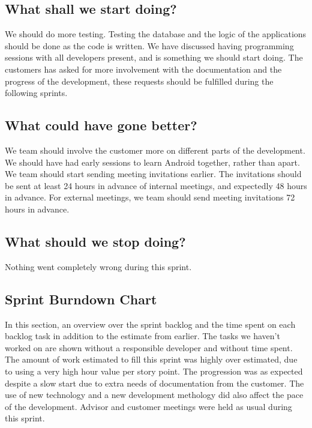 \subsection*{What shall we start doing?}
We should do more testing. Testing the database and the logic of the applications should be done as the code is written.
We have discussed having programming sessions with all developers present, and is something we should start doing.
The customers has asked for more involvement with the documentation and the progress of the development, these requests should be fulfilled during the following sprints.

\subsection*{What could have gone better?}
We team should involve the customer more on different parts of the development.
We should have had early sessions to learn Android together, rather than apart.
We team should start sending meeting invitations earlier. The invitations should be sent at least 24 hours in
advance of internal meetings, and expectedly 48 hours in advance. For external meetings,
we team should send meeting invitations 72 hours in advance.

\subsection*{What should we stop doing?}
Nothing went completely wrong during this sprint.

\subsection{Sprint Burndown Chart}
In this section, an overview over the sprint backlog and the time spent on each backlog task in
addition to the estimate from earlier. The tasks we haven't worked on are shown without a responsible
developer and without time spent. The amount of work estimated to fill this sprint was highly over
estimated, due to using a very high hour value per story point. The progression was
as expected despite a slow start due to extra needs of documentation from the customer. The use of new
technology and a new development methology did also affect the pace of the development. Advisor and
customer meetings were held as usual during this sprint.

